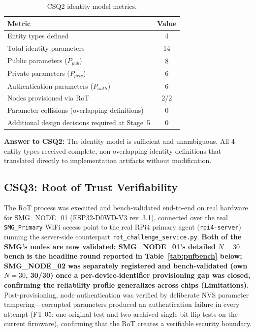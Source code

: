\documentclass[preprint,12pt,authoryear]{elsarticle}
\begin{document}
\begin{table}[htbp]
    \centering
    \caption{CSQ2 identity model metrics.}
    \label{tab:csq2}
    \small
    \begin{tabular}{lc}
        \toprule
        \textbf{Metric} & \textbf{Value} \\
        \midrule
        Entity types defined & 4 \\
        Total identity parameters & 14 \\
        Public parameters ($P_{pub}$) & 8 \\
        Private parameters ($P_{priv}$) & 6 \\
        Authentication parameters ($P_{auth}$) & 6 \\
        Nodes provisioned via RoT & 2/2 \\
        Parameter collisions (overlapping definitions) & 0 \\
        Additional design decisions required at Stage~5 & 0 \\
        \bottomrule
    \end{tabular}
\end{table}

\textbf{Answer to CSQ2:} The identity model is sufficient and unambiguous. All 4 entity types received complete, non-overlapping identity definitions that translated directly to implementation artifacts without modification.

\subsection{CSQ3: Root of Trust Verifiability}
\label{subsec:pufbench}

The RoT process was executed and bench-validated end-to-end on real hardware for SMG\_NODE\_01 (ESP32-D0WD-V3 rev~3.1), connected over the real \texttt{SMG\_Primary} WiFi access point to the real RPi4 primary agent (\texttt{rpi4-server}) running the server-side counterpart \texttt{rot\_challenge\_service.py}. \textbf{Both of the SMG's nodes are now validated: SMG\_NODE\_01's detailed $N=30$ bench is the headline round reported in Table~\ref{tab:pufbench} below; SMG\_NODE\_02 was separately registered and bench-validated (own $N=30$, 30/30) once a per-device-identifier provisioning gap was closed, confirming the reliability profile generalizes across chips (Limitations).} Post-provisioning, node authentication was verified by deliberate NVS parameter tampering---corrupted parameters produced an authentication failure in every attempt (FT-05: one original test and two archived single-bit-flip tests on the current firmware), confirming that the RoT creates a verifiable security boundary.
\end{document}
